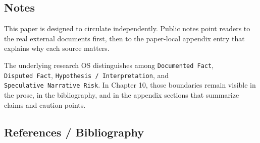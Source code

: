 \documentclass[
  american,
  11pt,
  letterpaper,
]{article}
\begin{document}
\subsection{Notes}\label{notes-10}

This paper is designed to circulate independently. Public notes point
readers to the real external documents first, then to the paper-local
appendix entry that explains why each source matters.

The underlying research OS distinguishes among
\texttt{Documented\ Fact}, \texttt{Disputed\ Fact},
\texttt{Hypothesis\ /\ Interpretation}, and
\texttt{Speculative\ Narrative\ Risk}. In Chapter 10, those boundaries
remain visible in the prose, in the bibliography, and in the appendix
sections that summarize claims and caution points.

\subsection{References / Bibliography}\label{references-bibliography-10}
\end{document}
